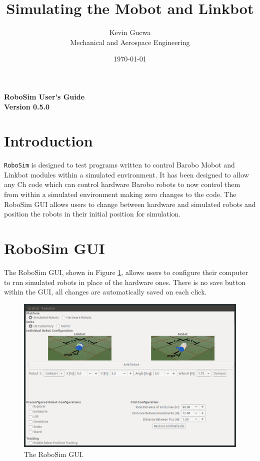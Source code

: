 \documentclass{article}
\title{Simulating the Mobot and Linkbot}
\author{Kevin Gucwa\\Mechanical and Aerospace Engineering}
\date{\today}
\begin{document}
\begin{center}
{\Huge\sf\bf RoboSim User's Guide}\\
\vspace*{2.5cm}
{\Large\bf Version 0.5.0}
\vspace{4.5cm}
\end{center}

\newpage
\tableofcontents
\newpage

\section{Introduction}
\texttt{RoboSim} is designed to test programs written to control Barobo Mobot
and Linkbot modules within a simulated environment.  It has been designed to
allow any Ch code which can control hardware Barobo robots to now control them
from within a simulated environment making zero changes to the code.  The
RoboSim GUI allows users to change between hardware and simulated robots and
position the robots in their initial position for simulation.

\section{RoboSim GUI}
\label{sec:gui}
The RoboSim GUI, shown in Figure \ref{fig:gui}, allows users to configure their
computer to run simulated robots in place of the hardware ones.  There is no
save button within the GUI, all changes are automatically saved on each click.

\begin{figure}[H]
	\begin{center}
		\includegraphics[width=6in]{images/gui}
	\end{center}
	\caption{The RoboSim GUI.}
	\label{fig:gui}
\end{figure}
\end{document}
